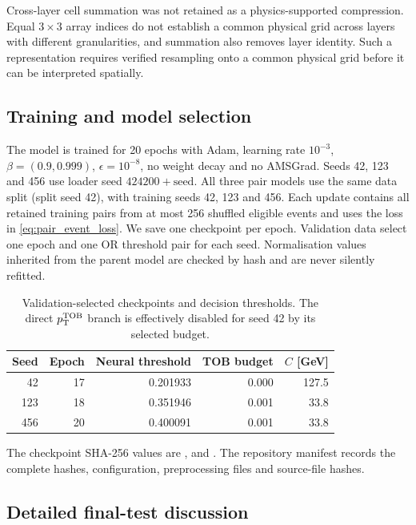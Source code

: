 Cross-layer cell summation was not retained as a physics-supported
compression. Equal $3\times3$ array indices do not establish a common
physical grid across layers with different granularities, and summation also
removes layer identity. Such a representation requires verified resampling
onto a common physical grid before it can be interpreted spatially.

\clearpage
\subsection{Training and model selection}
The model is trained for 20 epochs with Adam, learning rate $10^{-3}$,
$\beta=(0.9,0.999)$, $\epsilon=10^{-8}$, no weight decay and no AMSGrad. Seeds
42, 123 and 456 use loader seed $424200+\mathrm{seed}$. All three pair models
use the same data split (split seed 42), with training seeds 42, 123 and 456.
Each update contains all retained training pairs from at most 256 shuffled
eligible events and uses the loss in
\eqref{eq:pair_event_loss}. We save one checkpoint per epoch. Validation data
select one epoch and one OR threshold pair for each seed. Normalisation values
inherited from the parent model are checked by hash and are never silently
refitted.

\begin{table}[h]
  \centering
  \caption{Validation-selected checkpoints and decision thresholds. The direct
  $p_{\mathrm{T}}^{\mathrm{TOB}}$ branch is effectively disabled for seed 42 by its selected budget.}
  \label{tab:pair_thresholds}
  \small
  \begin{tabular}{@{}rrrrr@{}}
    \toprule
    Seed & Epoch & Neural threshold & TOB budget & $C$ [GeV] \\
    \midrule
    42  & 17 & 0.201933 & 0.000 & 127.5 \\
    123 & 18 & 0.351946 & 0.001 & 33.8 \\
    456 & 20 & 0.400091 & 0.001 & 33.8 \\
    \bottomrule
  \end{tabular}
\end{table}

The checkpoint SHA-256 values are
,
 and
. The repository manifest records the complete
hashes, configuration, preprocessing files and source-file hashes.

\subsection{Detailed final-test discussion}
